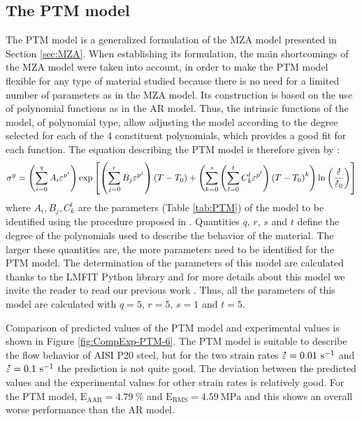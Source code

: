 \documentclass[twoside,english,1p,final,sort&compress]{elsarticle}
\theoremstyle{plain}
\DeclareRobustCommand{\mdot}[1]{\accentset{\mbox{\bfseries .}}{#1}}
\DeclareRobustCommand{\RMSE}{\text{E}_\text{RMS}}
\DeclareRobustCommand{\AARE}{\text{E}_\text{AAR}}
\DeclareRobustCommand{\ps}{\text{s}^{-1}}
\begin{document}
\subsection{The PTM model\label{sec:PTM}}

The PTM model \cite{TizeMha-2022} is a generalized formulation of the MZA model presented in Section \ref{sec:MZA}.
When establishing its formulation, the main shortcomings of the MZA model were taken into account, in order to make the PTM model flexible for any type of material studied because there is no need for a limited number of parameters as in the MZA model.
Its construction is based on the use of polynomial functions as in the AR model.
Thus, the intrinsic functions of the model, of polynomial type, allow adjusting the model according to the degree selected for each of the 4 constituent polynomials, which provides a good fit for each function.
The equation describing the PTM model is therefore given by :
\begin{equation}
\label{eq:PTM-model}
\sigma^y = \left(\sum_{i=0}^{q}{A_i\varepsilon^{p^i}}\right) \exp\left[\left(\sum_{j=0}^{r}{B_j\varepsilon^{p^j}}\right)\left(T-T_0\right) + \left(\sum_{k=0}^{s}\left(\sum_{l=0}^{t}{C_k^l\varepsilon^{p^l}} \right)\left(T-T_0\right)^k \right)\ln\left( \frac{\mdot\varepsilon}{\mdot{\varepsilon}_0}\right)\right]
\end{equation}
where $A_i, B_j, C_k^l$ are the parameters (Table \ref{tab:PTM}) of the model to be identified using the procedure proposed in  \cite{TizeMha-2022}.
Quantities $q$, $r$, $s$ and $t$ define the degree of the polynomials used to describe the behavior of the material.
The larger these quantities are, the more parameters need to be identified for the PTM model.
The determination of the parameters of this model are calculated thanks to the LMFIT Python library \cite{Newville-2016} and for more details about this model  we invite the reader to read our previous work \cite{TizeMha-2022}.
Thus, all the parameters of this model are calculated with $q=5$, $r=5$, $s=1$ and $t=5$.

Comparison of predicted values of the PTM model and experimental values is shown in Figure \ref{fig:CompExp-PTM-6}.
The PTM model is suitable to describe the ﬂow behavior of AISI P20 steel, but for the two strain rates $\mdot\varepsilon=0.01~\ps$ and $\mdot\varepsilon=0.1~\ps$ the prediction is not quite good.
The deviation between the predicted values and the experimental values for other strain rates is relatively good.
For the PTM model, $\AARE=4.79~\%$ and $\RMSE=4.59~\text{MPa}$ and this shows an overall worse performance than the AR model.
\end{document}
